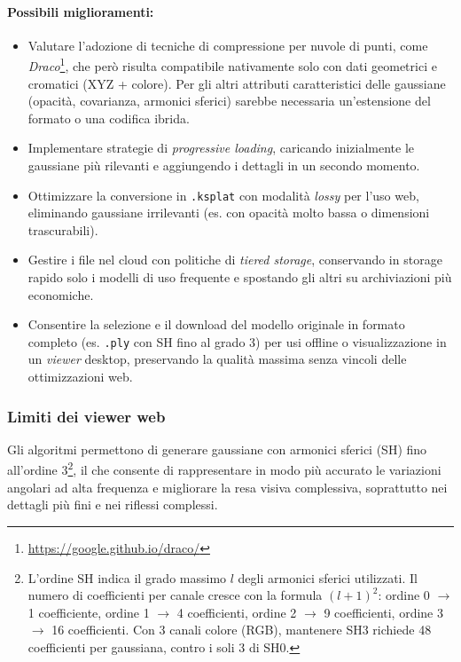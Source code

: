 \paragraph{Possibili miglioramenti:}
\begin{itemize}
	\item Valutare l'adozione di tecniche di compressione per nuvole di punti, come \emph{Draco}\footnote{\url{https://google.github.io/draco/}}, che però risulta compatibile nativamente solo con dati geometrici e cromatici (XYZ + colore).  
	Per gli altri attributi caratteristici delle gaussiane (opacità, covarianza, armonici sferici) sarebbe necessaria un'estensione del formato o una codifica ibrida.
	\item Implementare strategie di \emph{progressive loading}, caricando inizialmente le gaussiane più rilevanti e aggiungendo i dettagli in un secondo momento.
	\item Ottimizzare la conversione in \texttt{.ksplat} con modalità \emph{lossy} per l'uso web, eliminando gaussiane irrilevanti (es. con opacità molto bassa o dimensioni trascurabili).
	\item Gestire i file nel cloud con politiche di \emph{tiered storage}, conservando in storage rapido solo i modelli di uso frequente e spostando gli altri su archiviazioni più economiche.
	\item Consentire la selezione e il download del modello originale in formato completo (es. \texttt{.ply} con SH fino al grado 3) per usi offline o visualizzazione in un \emph{viewer} desktop, preservando la qualità massima senza vincoli delle ottimizzazioni web.
\end{itemize}

\subsubsection{Limiti dei viewer web}
Gli algoritmi permettono di generare gaussiane con armonici sferici (SH) fino all'ordine 3\footnote{L'ordine SH indica il grado massimo $l$ degli armonici sferici utilizzati.  
	Il numero di coefficienti per canale cresce con la formula $(l+1)^2$:  
	ordine 0 $\rightarrow$ 1 coefficiente, ordine 1 $\rightarrow$ 4 coefficienti, ordine 2 $\rightarrow$ 9 coefficienti, ordine 3 $\rightarrow$ 16 coefficienti.  
	Con 3 canali colore (RGB), mantenere SH3 richiede 48 coefficienti per gaussiana, contro i soli 3 di SH0.}, il che consente di rappresentare in modo più accurato le variazioni angolari ad alta frequenza e migliorare la resa visiva complessiva, soprattutto nei dettagli più fini e nei riflessi complessi.  

